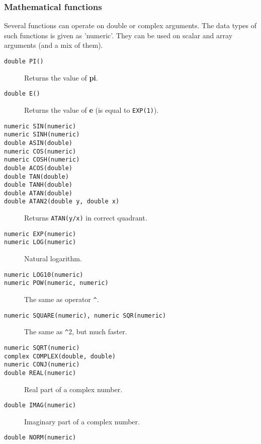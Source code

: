 \subsubsection{Mathematical functions}
Several functions can operate on double or complex arguments.
The data types of such functions is given as 'numeric'.
They can be used on scalar and array arguments (and a mix of them).
\begin{description}
  \item[ \texttt{double PI()}] Returns the value of \textbf{pi}.
  \item[ \texttt{double E()}] Returns the value of \textbf{e} (is equal to \texttt{EXP(1)}).
  \item[ \texttt{numeric SIN(numeric)}]
  \item[ \texttt{numeric SINH(numeric)}]
  \item[ \texttt{double ASIN(double)}]
  \item[ \texttt{numeric COS(numeric)}]
  \item[ \texttt{numeric COSH(numeric)}]
  \item[ \texttt{double ACOS(double)}]
  \item[ \texttt{double TAN(double)}]
  \item[ \texttt{double TANH(double)}]
  \item[ \texttt{double ATAN(double)}]
  \item[ \texttt{double ATAN2(double y, double x)}]
       Returns \texttt{ATAN(y/x)} in correct quadrant.
  \item[ \texttt{numeric EXP(numeric)}]
  \item[ \texttt{numeric LOG(numeric)}] Natural logarithm.
  \item[ \texttt{numeric LOG10(numeric)}]
  \item[ \texttt{numeric POW(numeric, numeric)}] The same as operator \verb+^+.
  \item[ \texttt{numeric SQUARE(numeric),  numeric SQR(numeric)}]
       The same as \verb+^+2, but much faster.
  \item[ \texttt{numeric SQRT(numeric)}]
  \item[ \texttt{complex COMPLEX(double, double)}]
  \item[ \texttt{numeric CONJ(numeric)}]
  \item[ \texttt{double REAL(numeric)}] Real part of a complex number.
  \item[ \texttt{double IMAG(numeric)}] Imaginary part of a complex number.
  \item[ \texttt{double NORM(numeric)}]

\end{description}
